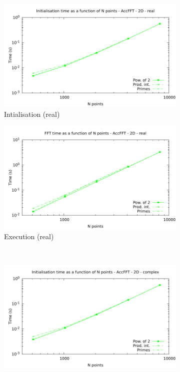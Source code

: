 \documentclass[12pt, a4paper]{article}
\begin{document}
\begin{figure}[H]
\captionsetup{width=0.8\linewidth}
\centering
\begin{subfigure}{.5\textwidth}
\centering
\includegraphics[width=.9\linewidth]{graphs/fft-openacc-2d-pow2-r-init.pdf}
\caption{Intialisation (real)}
\label{FFTACC2DRI}
\end{subfigure}%
\begin{subfigure}{.5\textwidth}
\centering
\includegraphics[width=.9\linewidth]{graphs/fft-openacc-2d-pow2-r-exec.pdf}
\caption{Execution (real)}
\label{FFTACC2DRE}
\end{subfigure}\\
\begin{subfigure}{.5\textwidth}
\centering
\includegraphics[width=.9\linewidth]{graphs/fft-openacc-2d-pow2-c-init.pdf}

\end{subfigure}
\end{figure}
\end{document}
